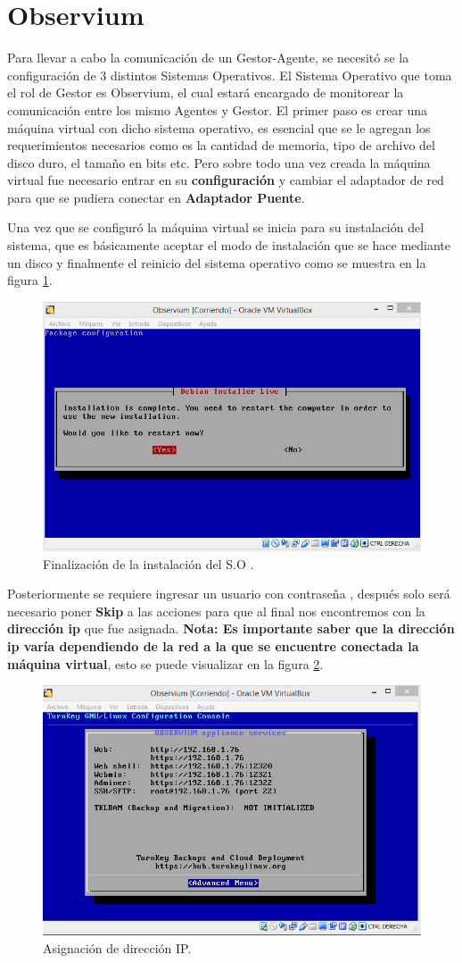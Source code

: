 \section{Observium}

Para llevar a cabo la comunicación de un Gestor-Agente, se necesitó se la configuración de 3 distintos Sistemas Operativos. 
El Sistema Operativo que toma el rol de Gestor es Observium, el cual estará encargado de monitorear la comunicación entre los mismo Agentes y Gestor. El primer paso es crear una máquina virtual con dicho sistema operativo, es esencial que se le agregan los requerimientos necesarios como es la cantidad de memoria, tipo de archivo del disco duro, el tamaño en bits etc. Pero sobre todo una vez creada la máquina virtual fue necesario entrar en su \textbf{configuración} y cambiar el adaptador de red para que se pudiera conectar en \textbf{Adaptador Puente}.
\\ \par
Una vez que se configuró la máquina virtual se inicia para su instalación del sistema, que es básicamente aceptar el modo de instalación que se hace mediante un disco y finalmente el reinicio del sistema operativo como se muestra en la figura \ref{image:fin}.

\FloatBarrier
\begin{figure}[htbp!]
		\centering
		    \includegraphics[width=.5 \textwidth]{../images/1-Observium.png}
		\caption{Finalización de la instalación del S.O .}
		\label{image:fin}
\end{figure}
\FloatBarrier

Posteriormente se requiere ingresar un usuario con contraseña , después solo será necesario poner  \textbf{Skip} a las acciones para que al final nos encontremos con la  \textbf{dirección ip} que fue asignada.
 \textbf{Nota: Es importante saber que la dirección ip varía dependiendo de la red a la que se encuentre conectada la máquina virtual}, esto se puede visualizar en la figura \ref{image:ip}.

\FloatBarrier
\begin{figure}[htbp!]
		\centering
		    \includegraphics[width=.5 \textwidth]{../images/2-Observium.png} 
		\caption{Asignación de dirección IP.}
		\label{image:ip}
\end{figure}
\FloatBarrier

